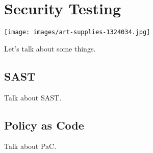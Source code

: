 \chapter{Security Testing}

\texttt{[image: images/art-supplies-1324034.jpg]}

Let's talk about some things. 

\section{SAST}
\justify{}
Talk about SAST.

\section{Policy as Code}
\justify{}
Talk about PaC.
